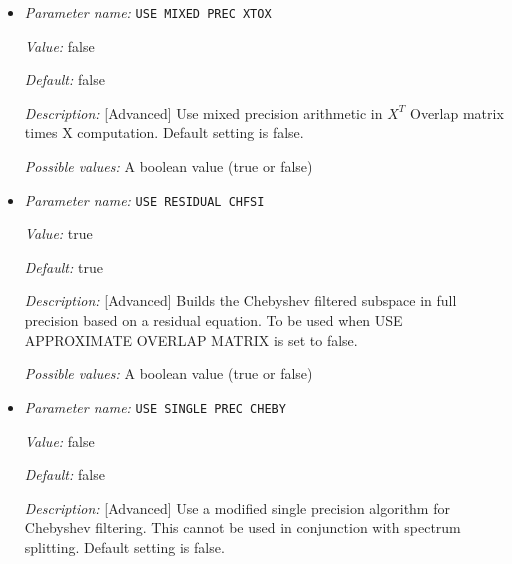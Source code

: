 \begin{itemize}
{\it Default:} false


{\it Description:} [Advanced] Use mixed precision arithmetic in $X^{T}$ Hamiltonian matrix times X computation. Default setting is false.


{\it Possible values:} A boolean value (true or false)
\item {\it Parameter name:} {\tt USE MIXED PREC XTOX}
\label{parameters:SCF parameters/Eigen_2dsolver parameters/USE MIXED PREC XTOX}
\label{parameters:SCF_20parameters/Eigen_2dsolver_20parameters/USE_20MIXED_20PREC_20XTOX}


{\it Value:} false


{\it Default:} false


{\it Description:} [Advanced] Use mixed precision arithmetic in $X^{T}$ Overlap matrix times X computation. Default setting is false.


{\it Possible values:} A boolean value (true or false)
\item {\it Parameter name:} {\tt USE RESIDUAL CHFSI}
\label{parameters:SCF parameters/Eigen_2dsolver parameters/USE RESIDUAL CHFSI}
\label{parameters:SCF_20parameters/Eigen_2dsolver_20parameters/USE_20RESIDUAL_20CHFSI}


{\it Value:} true


{\it Default:} true


{\it Description:} [Advanced] Builds the Chebyshev filtered subspace in full precision based on a residual equation. To be used when USE APPROXIMATE OVERLAP MATRIX is set to false.


{\it Possible values:} A boolean value (true or false)
\item {\it Parameter name:} {\tt USE SINGLE PREC CHEBY}
\label{parameters:SCF parameters/Eigen_2dsolver parameters/USE SINGLE PREC CHEBY}
\label{parameters:SCF_20parameters/Eigen_2dsolver_20parameters/USE_20SINGLE_20PREC_20CHEBY}


{\it Value:} false


{\it Default:} false


{\it Description:} [Advanced] Use a modified single precision algorithm for Chebyshev filtering. This cannot be used in conjunction with spectrum splitting. Default setting is false.



\end{itemize}
